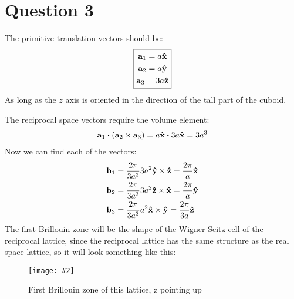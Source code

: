 \documentclass[12pt]{article}
\newcommand{\fig}[3]
{
  \begin{figure}[H]
    \centering
    \texttt{[image: \#2]}
    \caption{#3}
  \end{figure}
}
\begin{document}
\section*{Question 3}
The primitive translation vectors should be:
\begin{equation*}
  \boxed{
    \begin{gathered}
      \vb{a}_1=a\vu{x}\\
      \vb{a}_2=a\vu{y}\\
      \vb{a}_3=3a\vu{z}
    \end{gathered}
  }
\end{equation*}
As long as the $z$ axis is oriented in the direction of the tall part of the cuboid.

The reciprocal space vectors require the volume element:
\begin{align*}
  \vb{a}_1\vdot\qty(\vb{a}_2\times\vb{a}_3)=a\vu{x}\vdot3a\vu{x}=3a^3
\end{align*}
Now we can find each of the vectors:
\begin{align*}
  \vb{b}_1&=\frac{2\pi}{3a^3}3a^2\vu{y}\times\vu{z}=\frac{2\pi}{a}\vu{x}\\
  \vb{b}_2&=\frac{2\pi}{3a^3}3a^2\vu{z}\times\vu{x}=\frac{2\pi}{a}\vu{y}\\
  \vb{b}_3&=\frac{2\pi}{3a^3}a^2\vu{x}\times\vu{y}=\frac{2\pi}{3a}\vu{z}
\end{align*}
The first Brillouin zone will be the shape of the Wigner-Seitz cell of the reciprocal lattice, since the reciprocal lattice has the same structure as the real space lattice, so it will look something like this:
\fig{5.0}{hw2bz}{First Brillouin zone of this lattice, z pointing up}
\end{document}
